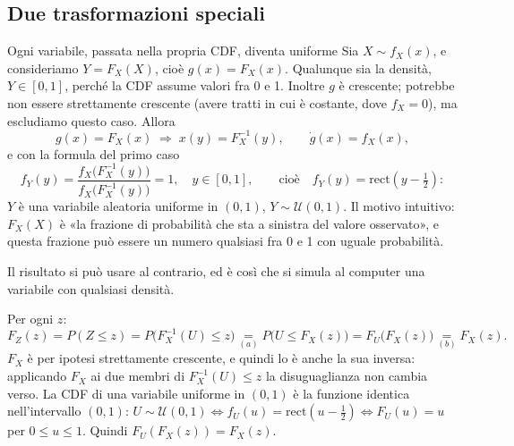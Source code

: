 
\subsection{Due trasformazioni speciali}

\begin{esempio}{Ogni variabile, passata nella propria CDF, diventa uniforme}
Sia $X \sim f_X(x)$, e consideriamo $Y = F_X(X)$, cioè $g(x) = F_X(x)$. Qualunque sia la densità, $Y \in [0, 1]$,
perché la CDF assume valori fra 0 e 1. Inoltre $g$ è crescente; potrebbe non essere strettamente crescente (avere
tratti in cui è costante, dove $f_X = 0$), ma escludiamo questo caso. Allora
\[ g(x) = F_X(x) \;\Longrightarrow\; x(y) = F_X^{-1}(y) , \qquad \dot g(x) = f_X(x) , \]
e con la formula del primo caso
\[ f_Y(y) = \frac{f_X\big(F_X^{-1}(y)\big)}{f_X\big(F_X^{-1}(y)\big)} = 1 , \quad y \in [0, 1] , \qquad\text{cioè}\quad
   f_Y(y) = \mathrm{rect}\left( y - \tfrac12 \right) : \]
$Y$ è una variabile aleatoria uniforme in $(0, 1)$, $Y \sim \mathcal{U}(0, 1)$. Il motivo intuitivo: $F_X(X)$ è «la
frazione di probabilità che sta a sinistra del valore osservato», e questa frazione può essere un numero qualsiasi fra 0
e 1 con uguale probabilità.
\end{esempio}

Il risultato si può usare al contrario, ed è così che si simula al computer una variabile con qualsiasi densità.


\begin{dimostrazione}
\passo{} Per ogni $z$:
\[ F_Z(z) = P(Z \leq z) = P\big(F_X^{-1}(U) \leq z\big) \underset{(a)}{=} P\big(U \leq F_X(z)\big) = F_U\big(F_X(z)\big)
   \underset{(b)}{=} F_X(z) . \]
 $F_X$ è per ipotesi strettamente crescente, e quindi lo è anche la sua inversa: applicando $F_X$ ai due
membri di $F_X^{-1}(U) \leq z$ la disuguaglianza non cambia verso.
 La CDF di una variabile uniforme in $(0, 1)$ è la funzione identica nell'intervallo $(0, 1)$:
$U \sim \mathcal{U}(0, 1) \iff f_U(u) = \mathrm{rect}\left(u - \frac12\right) \iff F_U(u) = u$ per $0 \leq u \leq 1$.
Quindi $F_U(F_X(z)) = F_X(z)$.
\end{dimostrazione}

